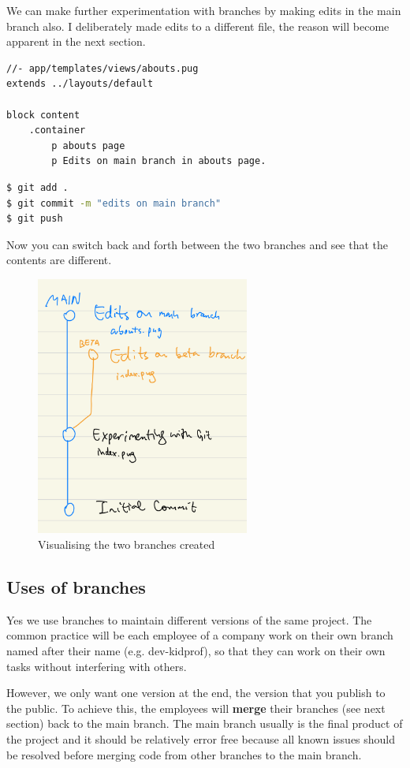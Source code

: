 We can make further experimentation with branches by making edits in the main branch also. I deliberately made edits to a different file, the reason will become apparent in the next section.

\begin{lstlisting}[language=pug]
//- app/templates/views/abouts.pug
extends ../layouts/default

block content
	.container
		p abouts page
		p Edits on main branch in abouts page.
\end{lstlisting}

\begin{lstlisting}[language=bash]
$ git add .
$ git commit -m "edits on main branch"
$ git push
\end{lstlisting}

Now you can switch back and forth between the two branches and see that the contents are different.

\begin{figure}[h]
\centering
\includegraphics[width=7cm]{images/ch8-branching.png}
\caption{Visualising the two branches created}
\end{figure}

\subsection*{Uses of branches}
Yes we use branches to maintain different versions of the same project. The common practice will be each employee of a company work on their own branch named after their name (e.g. dev-kidprof), so that they can work on their own tasks without interfering with others.

However, we only want one version at the end, the version that you publish to the public. To achieve this, the employees will \textbf{merge} their branches (see next section) back to the main branch. The main branch usually is the final product of the project and it should be relatively error free because all known issues should be resolved before merging code from other branches to the main branch.

